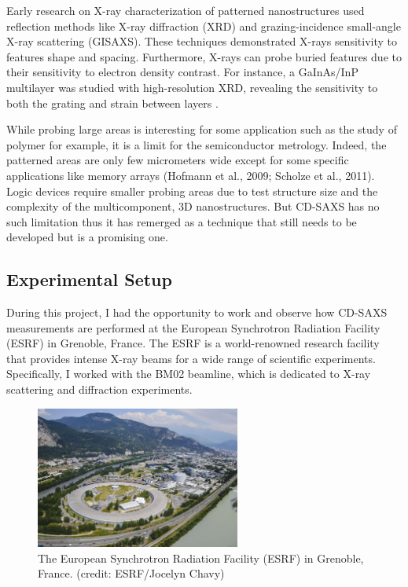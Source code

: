 \medskip
Early research on X-ray characterization of patterned nanostructures used reflection
methods like X-ray diffraction (XRD) and grazing-incidence small-angle X-ray scattering (GISAXS). 
These techniques demonstrated X-rays sensitivity to features shape and spacing.
Furthermore, X-rays can probe buried features due to their sensitivity to electron density contrast. For instance, a GaInAs/InP multilayer was studied with high-resolution XRD, revealing 
the sensitivity to both the grating and strain between layers \cite{Baumbach_Lübbert_Gailhanou_2000}.

\medskip

While probing large areas is interesting for some application such as the study of polymer for example, it is a limit for 
the semiconductor metrology. Indeed, the patterned areas are only few micrometers wide except for some specific applications like memory arrays (Hofmann et al.,
2009; Scholze et al., 2011). Logic devices require smaller probing areas due to test structure 
size and the complexity of the multicomponent, 3D nanostructures. But CD-SAXS has no such limitation thus it has remerged as a technique that still needs to be developed but is a promising one.\cite{phd_freychet}

\medskip




\subsection{Experimental Setup}

During this project, I had the opportunity to work and observe how CD-SAXS 
measurements are performed at the European Synchrotron Radiation Facility (ESRF)
in Grenoble, France. The ESRF is a world-renowned research facility that provides
intense X-ray beams for a wide range of scientific experiments. Specifically,
I worked with the BM02 beamline, which is dedicated to X-ray scattering and diffraction experiments.

\begin{figure}[h]
\centering
\includegraphics[width=0.6\textwidth]{images/esrf.jpg}
\caption{The European Synchrotron Radiation Facility (ESRF) in Grenoble, France. (credit: ESRF/Jocelyn Chavy)}
\label{fig
}
\end{figure}

